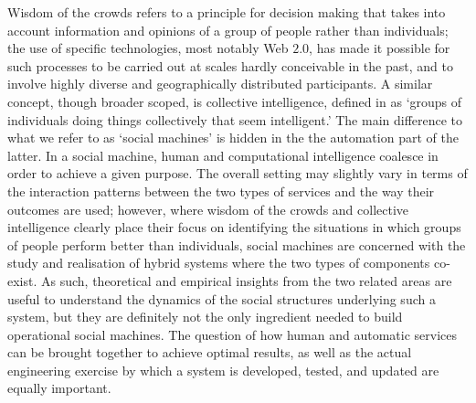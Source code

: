 \documentclass{sig-alternate}
\begin{document}
Wisdom of the crowds \cite{surowiecki2005wisdom} refers to a principle for decision making that takes into account information and opinions of a group of people rather than individuals; the use of specific technologies, most notably Web $2.0$, has made it possible for such processes to be carried out at scales hardly conceivable in the past, and to involve highly diverse and geographically distributed participants. A similar concept, though broader scoped, is collective intelligence, defined in \cite{malone2009harnessing} as `groups of individuals doing things collectively that seem intelligent.' The main difference to what we refer to as `social machines' is hidden in the the automation part of the latter. In a social machine, human and computational intelligence coalesce in order to achieve a given purpose. The overall setting may slightly vary in terms of the interaction patterns between the two types of services and the way their outcomes are used; however, where wisdom of the crowds and collective intelligence clearly place their focus on identifying the situations in which groups of people perform better than individuals, social machines are concerned with the study and realisation of hybrid systems where the two types of components co-exist. As such, theoretical and empirical insights from the two related areas are useful to understand the dynamics of the social structures underlying such a system, but they are definitely not the only ingredient needed to build operational social machines. The question of how human and automatic services can be brought together to achieve optimal results, as well as the actual engineering exercise by which a system is developed, tested, and updated are equally important.
\end{document}
